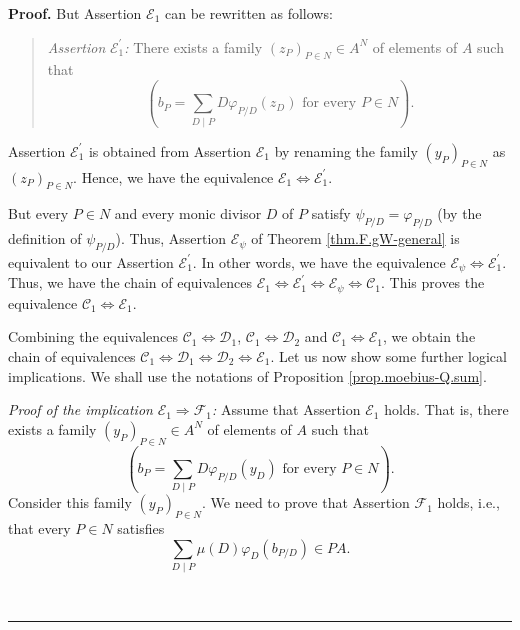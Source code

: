 \documentclass[numbers=enddot,12pt,final,onecolumn,notitlepage]{scrartcl}%
\theoremstyle{definition}
\newenvironment{statement}{\begin{quote}}{\end{quote}}
\newenvironment{proof}[1][Proof]{\noindent\textbf{#1.} }{\ \rule{0.5em}{0.5em}}
\let\sumnonlimits\sum
\renewcommand{\sum}{\sumnonlimits\limits}
\begin{document}
\begin{proof}
But Assertion $\mathcal{E}_{1}$ can be rewritten as follows:

\begin{statement}
\textit{Assertion }$\mathcal{E}_{1}^{\prime}$\textit{:} There exists a family
$\left(  z_{P}\right)  _{P\in N}\in A^{N}$ of elements of $A$ such that%
\[
\left(  b_{P}=\sum_{D\mid P}D\varphi_{P/D}\left(  z_{D}\right)  \text{ for
every }P\in N\right)  .
\]

\end{statement}

Assertion $\mathcal{E}_{1}^{\prime}$ is obtained from Assertion $\mathcal{E}%
_{1}$ by renaming the family $\left(  y_{P}\right)  _{P\in N}$ as $\left(
z_{P}\right)  _{P\in N}$. Hence, we have the equivalence $\mathcal{E}%
_{1}\Longleftrightarrow\mathcal{E}_{1}^{\prime}$.

But every $P\in N$ and every monic divisor $D$ of $P$ satisfy $\psi
_{P/D}=\varphi_{P/D}$ (by the definition of $\psi_{P/D}$). Thus, Assertion
$\mathcal{E}_{\psi}$ of Theorem \ref{thm.F.gW-general} is equivalent to our
Assertion $\mathcal{E}_{1}^{\prime}$. In other words, we have the equivalence
$\mathcal{E}_{\psi}\Longleftrightarrow\mathcal{E}_{1}^{\prime}$. Thus, we have
the chain of equivalences $\mathcal{E}_{1}\Longleftrightarrow\mathcal{E}%
_{1}^{\prime}\Longleftrightarrow\mathcal{E}_{\psi}\Longleftrightarrow
\mathcal{C}_{1}$. This proves the equivalence $\mathcal{C}_{1}%
\Longleftrightarrow\mathcal{E}_{1}$.

Combining the equivalences $\mathcal{C}_{1}\Longleftrightarrow\mathcal{D}_{1}%
$, $\mathcal{C}_{1}\Longleftrightarrow\mathcal{D}_{2}$ and $\mathcal{C}%
_{1}\Longleftrightarrow\mathcal{E}_{1}$, we obtain the chain of equivalences
$\mathcal{C}_{1}\Longleftrightarrow\mathcal{D}_{1}\Longleftrightarrow
\mathcal{D}_{2}\Longleftrightarrow\mathcal{E}_{1}$. Let us now show some
further logical implications. We shall use the notations of Proposition
\ref{prop.moebius-Q.sum}.

\textit{Proof of the implication }$\mathcal{E}_{1}\Longrightarrow
\mathcal{F}_{1}$\textit{:} Assume that Assertion $\mathcal{E}_{1}$ holds. That
is, there exists a family $\left(  y_{P}\right)  _{P\in N}\in A^{N}$ of
elements of $A$ such that%
\begin{equation}
\left(  b_{P}=\sum_{D\mid P}D\varphi_{P/D}\left(  y_{D}\right)  \text{ for
every }P\in N\right)  . \label{pf.thm.F.gW.EtoF.ass}%
\end{equation}
Consider this family $\left(  y_{P}\right)  _{P\in N}$. We need to prove that
Assertion $\mathcal{F}_{1}$ holds, i.e., that every $P\in N$ satisfies%
\[
\sum_{D\mid P}\mu\left(  D\right)  \varphi_{D}\left(  b_{P/D}\right)  \in PA.
\]



\end{proof}
\end{document}
